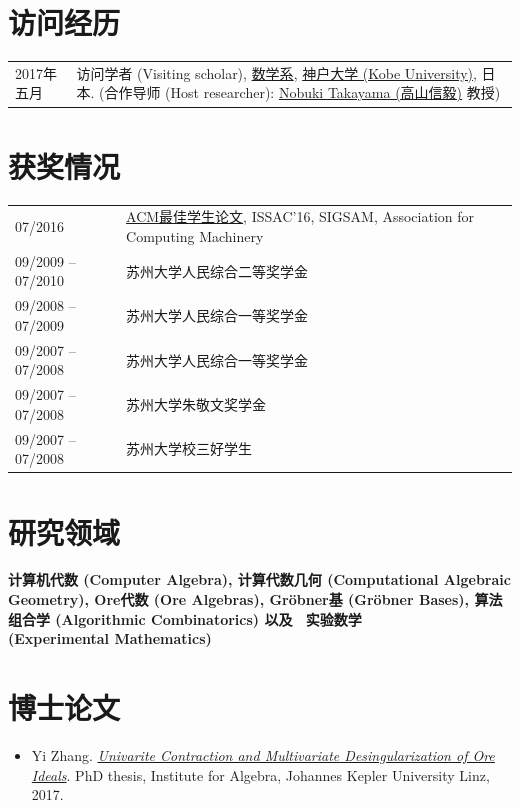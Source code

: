 \documentclass[a4paper,12pt]{article}
\begin{document}
\begin{CJK*}{UTF8}{gbsn}
\section*{\Large{访问经历}}

\vspace{.05in}
\begin{tabular}{@{}p{1.0in}p{4.5in}}
2017年五月               & 访问学者 (Visiting scholar), 
                        \href{http://www.math.kobe-u.ac.jp/}{数学系},
                        \href{http://www.kobe-u.ac.jp/en/}{神户大学 (Kobe University)}, 日本. 
                        (合作导师 (Host researcher): \href{http://www.math.kobe-u.ac.jp/home-j/takayama-e.html}{Nobuki Takayama (高山信毅)} 教授)\\
\end{tabular}

\section*{\Large{获奖情况}}

\begin{tabular}{@{}p{1.4in}p{4in}}
07/2016               & \href{https://www.sigsam.org/Awards/ISSACAwards.html}{ACM最佳学生论文}, 
                        ISSAC'16, SIGSAM, Association for Computing Machinery \\
09/2009 -- 07/2010    & 苏州大学人民综合二等奖学金\\
09/2008 -- 07/2009    & 苏州大学人民综合一等奖学金 \\
09/2007 -- 07/2008    & 苏州大学人民综合一等奖学金 \\ 
09/2007 -- 07/2008    & 苏州大学朱敬文奖学金 \\
09/2007 -- 07/2008    & 苏州大学校三好学生
\end{tabular}

\section*{\Large{研究领域}}
{\bf 计算机代数 (Computer Algebra), 计算代数几何 (Computational Algebraic Geometry), Ore代数 (Ore Algebras), 
Gr\"{o}bner基 (Gr\"{o}bner Bases), 算法组合学 (Algorithmic Combinatorics) 以及 \ 实验数学 \\ (Experimental Mathematics)}

\section*{\Large{博士论文}}
\begin{itemize}
 \item Yi Zhang. \href{https://yzhang1616.github.io/yzhang_PhDthesis_final.pdf}{{\em Univarite Contraction and Multivariate Desingularization of Ore Ideals}}. 
                PhD thesis, Institute for Algebra, Johannes Kepler University Linz, 2017.
\end{itemize}


\end{CJK*}
\end{document}
